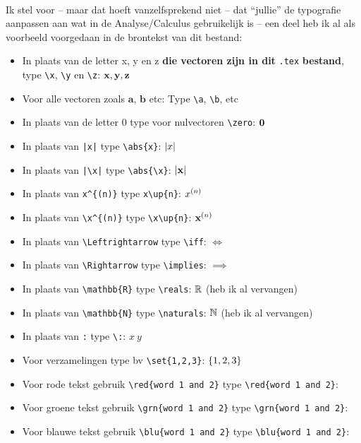 \documentclass{2wa40summary}
\begin{document}
		\ \\
		Ik stel voor -- maar dat hoeft vanzelfsprekend niet -- dat ``jullie'' de typografie aanpassen aan wat in de Analyse/Calculus gebruikelijk is -- een deel heb ik al als voorbeeld voorgedaan in de brontekst van dit bestand:
		\begin{itemize}
			\item In plaats van de letter x, y en z \textbf{die vectoren zijn in dit} \verb$.tex$ \textbf{bestand}, type
			\verb$\x$, \verb$\y$ en \verb$\z$: ${\textbf{x}}, {\textbf{y}}, {\textbf{z}}$
			\item Voor alle vectoren zoals $\mathbf{a}$, $\mathbf{b}$ etc: Type \verb$\a$, \verb$\b$, etc
			\item In plaats van de letter 0 type voor nulvectoren \verb$\zero$: ${\textbf{0}}$
			\item In plaats van \verb$|x|$ type \verb$\abs{x}$: ${\left|x\right|}$
			\item In plaats van \verb$|\x|$ type \verb$\abs{\x}$: ${\left|{\textbf{x}}\right|}$
			\item In plaats van \verb$x^{(n)}$ type \verb$x\up{n}$: $x^{(n)}$
			\item In plaats van \verb$\x^{(n)}$ type \verb$\x\up{n}$: ${\textbf{x}}^{(n)}$
			\item In plaats van \verb$\Leftrightarrow$ type \verb$\iff$: $\iff$
			\item In plaats van \verb$\Rightarrow$ type \verb$\implies$: $\implies$
			\item In plaats van \verb$\mathbb{R}$ type \verb$\reals$: $\mathbb{R}$ (heb ik al vervangen)
			\item In plaats van \verb$\mathbb{N}$ type \verb$\naturals$: $\mathbb{N}$ (heb ik al vervangen)
			\item In plaats van \verb$:$ type \verb$\:$: $x\: y$
			\item Voor verzamelingen type bv \verb$\set{1,2,3}$: $\lbrace1,2,3\rbrace$
			\item Voor rode tekst gebruik \verb$$ type \verb$\red{word 1 and 2}$: \red{word 1 and 2}
			\item Voor groene tekst gebruik \verb$$ type \verb$\grn{word 1 and 2}$: \grn{word 1 and 2}
			\item Voor blauwe tekst gebruik \verb$$ type \verb$\blu{word 1 and 2}$: \blu{word 1 and 2}

\end{itemize}
\end{document}

